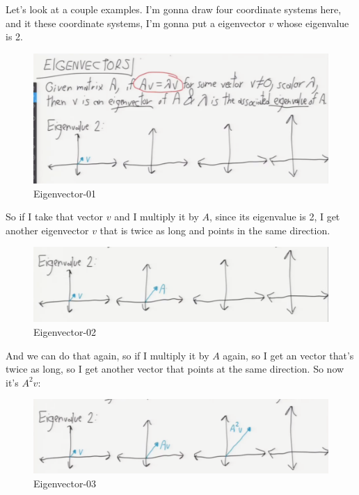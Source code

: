 \documentclass[fleqn,10pt]{olplainarticle}
\theoremstyle{definition}
\theoremstyle{remark}
\begin{document}
Let's look at a couple examples. I'm gonna draw four coordinate systems here, and it these coordinate systems, I'm gonna put a eigenvector $v$ whose eigenvalue is 2. 

\begin{figure}[ht]
\centering
\includegraphics[width=1.0\linewidth]{images/chpt08-01}
\caption{Eigenvector-01}
\label{fig:chpt08-01}
\end{figure}

So if I take that vector $v$ and I multiply it by $A$, since its eigenvalue is 2, I get another eigenvector $v$ that is twice as long and points in the same direction.

\begin{figure}[ht]
\centering
\includegraphics[width=1.0\linewidth]{images/chpt08-02}
\caption{Eigenvector-02}
\label{fig:chpt08-02}
\end{figure}
\clearpage

And we can do that again, so if I multiply it by $A$ again, so I get an vector that's twice as long, so I get another vector that points at the same direction. So now it's $A^2v$:

\begin{figure}[ht]
\centering
\includegraphics[width=1.0\linewidth]{images/chpt08-03}
\caption{Eigenvector-03}
\label{fig:chpt08-03}
\end{figure}
\end{document}
